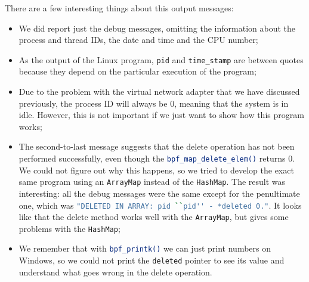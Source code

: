 There are a few interesting things about this output messages:

\begin{itemize}
	\item 
		We did report just the debug messages, omitting the information about the process and thread IDs, the date and time and the CPU number;
	\item 
		As the output of the Linux program, \colorbox{backcolour}{\lstinline[style=commandline, language=bash, breaklines=true]|pid|} and \colorbox{backcolour}{\lstinline[style=commandline, language=bash, breaklines=true]|time_stamp|} are between quotes because they depend on the particular execution of the program;
	\item 
		Due to the problem with the virtual network adapter that we have discussed previously, the process ID will always be 0, meaning that the system is in idle.
		However, this is not important if we just want to show how this program works;
	\item 
		The second-to-last message suggests that the delete operation has not been performed successfully, even though the \colorbox{backcolour}{\lstinline[style=commandline, language=bash, breaklines=true]|bpf_map_delete_elem()|} returns 0.
		We could not figure out why this happens, so we tried to develop the exact same program using an \colorbox{backcolour}{\lstinline[style=commandline, language=bash, breaklines=true]|ArrayMap|} instead of the \colorbox{backcolour}{\lstinline[style=commandline, language=bash, breaklines=true]|HashMap|}.
		The result was interesting: all the debug messages were the same except for the penultimate one, which was \colorbox{backcolour}{\lstinline[style=commandline, language=bash, breaklines=true]|"DELETED IN ARRAY: pid ``pid'' - *deleted 0."|}.
		It looks like that the delete method works well with the \colorbox{backcolour}{\lstinline[style=commandline, language=bash, breaklines=true]|ArrayMap|}, but gives some problems with the \colorbox{backcolour}{\lstinline[style=commandline, language=bash, breaklines=true]|HashMap|};
	\item 
		We remember that with \colorbox{backcolour}{\lstinline[style=commandline, language=bash, breaklines=true]|bpf_printk()|} we can just print numbers on Windows, so we could not print the \colorbox{backcolour}{\lstinline[style=commandline, language=bash, breaklines=true]|deleted|} pointer to see its value and understand what goes wrong in the delete operation.
\end{itemize}


